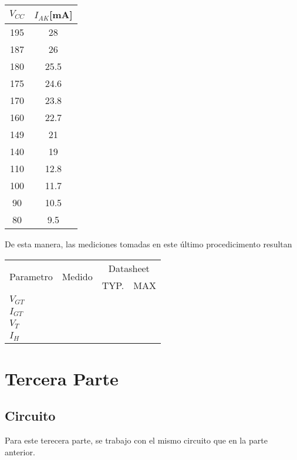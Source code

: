 \begin{table}[H]
  \begin{center}
    \begin{tabular}{c|c}
      $V_{CC}$ &$I_{AK}$[mA]   \\
      \hline
      195   &28   \\
      187   &26  \\
      180   &25.5  \\
      175   &24.6  \\
      170   &23.8  \\
      160   &22.7  \\
      149   &21  \\
      140   &19  \\
      110   &12.8  \\
      100   &11.7  \\
      90    &10.5  \\
      80    &9.5  \\
    \end{tabular}
  \end{center} 
\end{table}
De esta manera, las mediciones tomadas en este último procedicimento resultan
\begin{table}[H]
  \begin{center}
    \begin{tabular}{l|c|c|c}
      \multirow{2}{*}{Parametro} &\multirow{2}{*}{Medido}  &\multicolumn{2}{c}{Datasheet}  \\
      \cline{3-4}
                &  &TYP. &MAX  \\
      \hline
      $V_{GT}$  &   &   &  \\
      $I_{GT}$  &   &   &  \\
      $V_{T}$   &   &   &  \\
      $I_{H}$   &   &   &  \\
    \end{tabular}
  \end{center} 
\end{table}


\section{Tercera Parte}
\subsection{Circuito}
Para este terecera parte, se trabajo con el mismo circuito que en la parte anterior.
